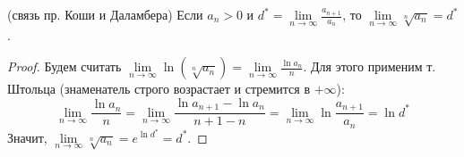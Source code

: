 \begin{theorem} (связь пр. Коши и Даламбера)
    Если $a_n > 0$ и $d^* = \lim\limits_{n \to \infty} \frac{a_{n+1}}{a_n}$, то $\lim\limits_{n \to \infty} \sqrt[n]{a_n} = d^*$.
\end{theorem}
\begin{proof}
    Будем считать $\lim\limits_{n \to \infty} \ln(\sqrt[n]{a_n}) = \lim\limits_{n \to \infty} \frac{\ln a_n}{n}$.
    Для этого применим т. Штольца (знаменатель строго возрастает и стремится в $+\infty$): \[ \lim\limits_{n \to \infty} \frac{\ln a_n}{n} = \lim\limits_{n \to \infty} \frac{\ln a_{n+1} - \ln a_n}{n + 1 - n} = \lim\limits_{n \to \infty} \ln \frac{a_{n+1}}{a_n} = \ln d^* \]
    \quad Значит, $\lim\limits_{n \to \infty} \sqrt[n]{a_n} = e^{\ln d^*} = d^*$.
\end{proof}
